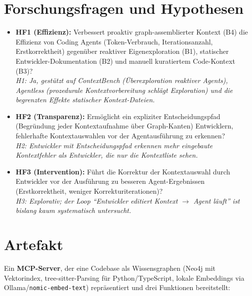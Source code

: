 \documentclass[12pt,a4paper]{scrartcl}
\newcommand{\code}[1]{\texttt{#1}}
\begin{document}
\section{Forschungsfragen und Hypothesen}

\begin{itemize}
  \item \textbf{HF1 (Effizienz):} Verbessert proaktiv graph-assemblierter Kontext (B4) die
    Effizienz von Coding Agents (Token-Verbrauch, Iterationsanzahl, Erstkorrektheit) gegenüber
    reaktiver Eigenexploration (B1), statischer Entwickler-Dokumentation (B2) und manuell
    kuratiertem Code-Kontext (B3)?\\
    \emph{H1: Ja, gestützt auf ContextBench (Überexploration reaktiver Agents), Agentless
    (prozedurale Kontextvorbereitung schlägt Exploration) und die begrenzten Effekte statischer
    Kontext-Dateien.}
  \item \textbf{HF2 (Transparenz):} Ermöglicht ein expliziter Entscheidungspfad (Begründung
    jeder Kontextaufnahme über Graph-Kanten) Entwicklern, fehlerhafte Kontextauswahlen vor der
    Agentausführung zu erkennen?\\
    \emph{H2: Entwickler mit Entscheidungspfad erkennen mehr eingebaute Kontextfehler als
    Entwickler, die nur die Kontextliste sehen.}
  \item \textbf{HF3 (Intervention):} Führt die Korrektur der Kontextauswahl durch Entwickler
    vor der Ausführung zu besseren Agent-Ergebnissen (Erstkorrektheit, weniger
    Korrekturiterationen)?\\
    \emph{H3: Explorativ; der Loop \enquote{Entwickler editiert Kontext $\rightarrow$ Agent
    läuft} ist bislang kaum systematisch untersucht.}
\end{itemize}

\section{Artefakt}

Ein \textbf{MCP-Server}, der eine Codebase als Wissensgraphen (Neo4j mit Vektorindex,
tree-sitter-Parsing für Python/TypeScript, lokale Embeddings via Ollama/\code{nomic-embed-text})
repräsentiert und drei Funktionen bereitstellt:
\end{document}
